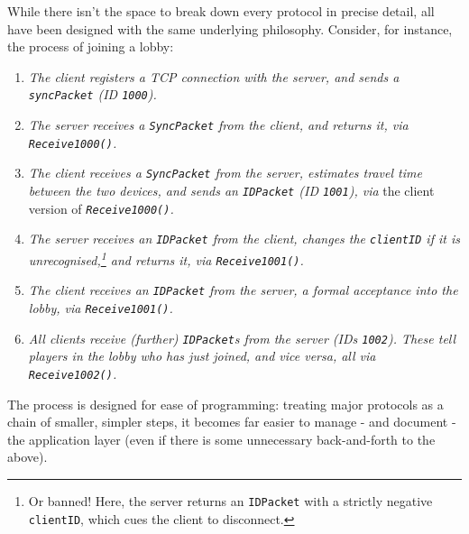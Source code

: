 \documentclass[a4paper, 10pt]{article}
\begin{document}
\begin{flushleft}
\vspace{5pt}\noindent
While there isn't the space to break down every protocol in precise detail, all have been designed with the same underlying philosophy. Consider, for instance, the process of joining a lobby:
\begin{enumerate}[label=\textit{\arabic*}\textit{.}, noitemsep]
\item \textit{The client registers a TCP connection with the server, and sends a \texttt{syncPacket} (ID \texttt{1000}).} %
\item \textit{The server receives a \texttt{SyncPacket} from the client, and returns it, via \texttt{Receive1000()}.} %
\item \textit{The client receives a \texttt{SyncPacket} from the server, estimates travel time between the two devices, and sends an \texttt{IDPacket} (ID \texttt{1001}), via} the client version of \textit{\texttt{Receive1000()}.} %
\item \textit{The server receives an \texttt{IDPacket} from the client, changes the \texttt{clientID} if it is unrecognised,\footnote{Or banned! Here, the server returns an \texttt{IDPacket} with a strictly negative \texttt{clientID}, which cues the client to disconnect.} and returns it, via \texttt{Receive1001()}.} %
\item \textit{The client receives an \texttt{IDPacket} from the server, a formal acceptance into the lobby, via \texttt{Receive1001()}.} %
\item \textit{All clients receive (further) \texttt{IDPacket}s from the server (IDs \texttt{1002}). These tell players in the lobby who has just joined, and vice versa, all via \texttt{Receive1002()}.}
\end{enumerate}
The process is designed for ease of programming: treating major protocols as a chain of smaller, simpler steps, it becomes far easier to manage - and document - the application layer (even if there is some unnecessary back-and-forth to the above).



\end{flushleft}
\end{document}

